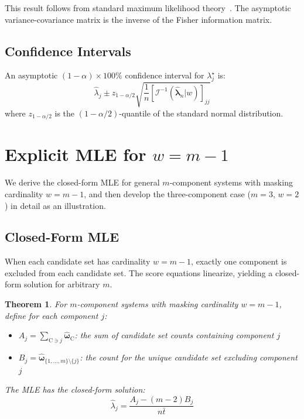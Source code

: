 \documentclass[pdflatex,sn-mathphys-num,Numbered]{sn-jnl}
\newcommand{\RV}[1]{\mathrm{#1}}
\newcommand{\cand}{\RV{C}}         %
\newcommand{\tparam}[1]{{#1}^{\star}}  %
\newcommand{\estimator}[1]{\hat{#1}}   %
\newcommand{\expomle}{\boldsymbol{\hat{\lambda}}_n}
\newcommand{\infomatrx}{\mathcal{I}}
\newcommand{\cntsymb}{\boldsymbol{\hat\omega}}
\theoremstyle{thmstyleone}
\newtheorem{theorem}{Theorem}[section]
\theoremstyle{thmstylethree}
\theoremstyle{thmstyletwo}
\begin{document}
This result follows from standard maximum likelihood theory~\cite[Theorem~2.5.1]{bickel}. The asymptotic variance-covariance matrix is the inverse of the Fisher information matrix.

\subsection{Confidence Intervals}

An asymptotic $(1-\alpha) \times 100\%$ confidence interval for $\tparam{\lambda}_j$ is:
\begin{equation}
\label{eq:confidence_interval}
\estimator{\lambda}_j \pm z_{1-\alpha/2} \sqrt{\frac{1}{n} [\infomatrx^{-1}(\expomle | w)]_{jj}}
\end{equation}
where $z_{1-\alpha/2}$ is the $(1-\alpha/2)$-quantile of the standard normal distribution.

\section{Explicit MLE for \texorpdfstring{$w = m-1$}{w = m-1}}
\label{sec:three_component}

We derive the closed-form MLE for general $m$-component systems with masking cardinality $w = m-1$, and then develop the three-component case ($m=3$, $w=2$) in detail as an illustration.

\subsection{Closed-Form MLE}

When each candidate set has cardinality $w=m-1$, exactly one component is excluded from each candidate set. The score equations linearize, yielding a closed-form solution for arbitrary $m$.

\begin{theorem}
\label{thm:mle_general_wm1}
For $m$-component systems with masking cardinality $w = m-1$, define for each component $j$:
\begin{itemize}
\item $A_j = \sum_{\cand \ni j} \cntsymb_{\cand}$: the sum of candidate set counts containing component $j$
\item $B_j = \cntsymb_{\{1,\ldots,m\} \setminus \{j\}}$: the count for the unique candidate set excluding component $j$
\end{itemize}
The MLE has the closed-form solution:
\begin{equation}
\label{eq:expo_mle_general_wm1}
\estimator{\lambda}_j = \frac{A_j - (m-2)B_j}{n\bar{t}}
\end{equation}
\end{theorem}
\end{document}
